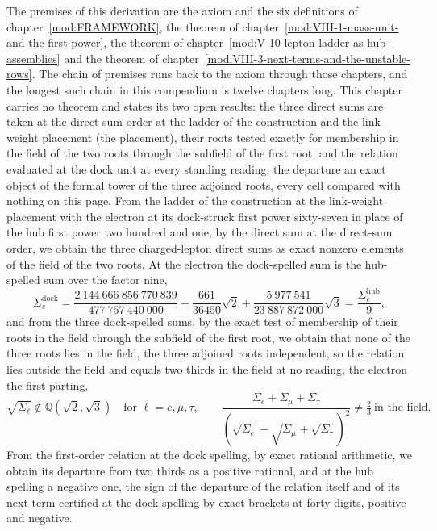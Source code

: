 \begin{chproof}[exact]
The premises of this derivation are the axiom and the six definitions of chapter~\ref{mod:FRAMEWORK}, the theorem of chapter~\ref{mod:VIII-1-mass-unit-and-the-first-power}, the theorem of chapter~\ref{mod:V-10-lepton-ladder-as-hub-assemblies} and the theorem of chapter~\ref{mod:VIII-3-next-terms-and-the-unstable-rows}. The chain of premises runs back to the axiom through those chapters, and the longest such chain in this compendium is twelve chapters long.
This chapter carries no theorem and states its two open results: the three direct sums are taken at the direct-sum order at the ladder of the construction and the link-weight placement (the placement), their roots tested exactly for membership in the field of the two roots through the subfield of the first root, and the relation evaluated at the dock unit at every standing reading, the departure an exact object of the formal tower of the three adjoined roots, every cell compared with nothing on this page.
From the ladder of the construction at the link-weight placement with the electron at its dock-struck first power sixty-seven in place of the hub first power two hundred and one, by the direct sum at the direct-sum order, we obtain the three charged-lepton direct sums as exact nonzero elements of the field of the two roots. At the electron the dock-spelled sum is the hub-spelled sum over the factor nine,
\begin{equation}
\Sigma_{e}^{\mathrm{dock}} = \frac{2\ 144\ 666\ 856\ 770\ 839}{477\ 757\ 440\ 000} + \frac{661}{36450}\sqrt{2} + \frac{5\ 977\ 541}{23\ 887\ 872\ 000}\sqrt{3} = \frac{\Sigma_{e}^{\mathrm{hub}}}{9} ,
\end{equation}
and from the three dock-spelled sums, by the exact test of membership of their roots in the field through the subfield of the first root, we obtain that none of the three roots lies in the field, the three adjoined roots independent, so the relation lies outside the field and equals two thirds in the field at no reading, the electron the first parting.
\begin{equation}
\sqrt{\Sigma_{\ell}} \notin \mathbb{Q}(\sqrt{2}, \sqrt{3}) \quad \text{for } \ell = e, \mu, \tau, \qquad \frac{\Sigma_{e} + \Sigma_{\mu} + \Sigma_{\tau}}{(\sqrt{\Sigma_{e}} + \sqrt{\Sigma_{\mu}} + \sqrt{\Sigma_{\tau}})^{2}} \ne \tfrac{2}{3} \ \text{in the field} .
\end{equation}
From the first-order relation at the dock spelling, by exact rational arithmetic, we obtain its departure from two thirds as a positive rational, and at the hub spelling a negative one, the sign of the departure of the relation itself and of its next term certified at the dock spelling by exact brackets at forty digits, positive and negative.

\end{chproof}
